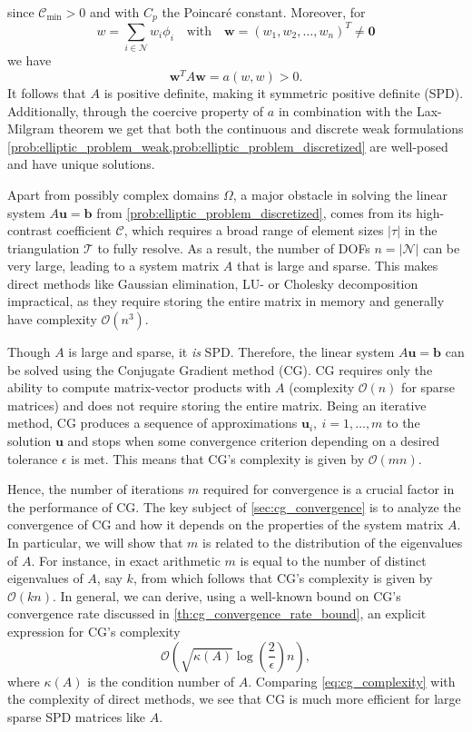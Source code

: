since $\mathcal{C}_{\text{min}}>0$ and with $C_p$ the Poincaré constant. Moreover, for 
\[
    w = \sum_{i\in\mathcal{N}} w_i \phi_i \quad \text{with} \quad \mathbf{w} = (w_1, w_2, \ldots, w_n)^T \neq \mathbf{0}
\]
we have
\begin{equation*}
    \mathbf{w}^T A \mathbf{w} = a(w,w) > 0.
\end{equation*}
It follows that $A$ is positive definite, making it symmetric positive definite (SPD). Additionally, through the coercive property of $a$ in combination with the Lax-Milgram theorem we get that both the continuous and discrete weak formulations \cref{prob:elliptic_problem_weak,prob:elliptic_problem_discretized} are well-posed and have unique solutions.

Apart from possibly complex domains $\Omega$, a major obstacle in solving the linear system $A\mathbf{u} = \mathbf{b}$ from \cref{prob:elliptic_problem_discretized}, comes from its high-contrast coefficient $\mathcal{C}$, which requires a broad range of element sizes $|\tau|$ in the triangulation $\mathcal{T}$ to fully resolve. As a result, the number of DOFs $n = |\mathcal{N}|$ can be very large, leading to a system matrix $A$ that is large and sparse. This makes direct methods like Gaussian elimination, LU- or Cholesky decomposition impractical, as they require storing the entire matrix in memory and generally have complexity $\mathcal{O}(n^3)$.

Though $A$ is large and sparse, it \textit{is} SPD. Therefore, the linear system $A\mathbf{u} = \mathbf{b}$ can be solved using the Conjugate Gradient method (CG). CG requires only the ability to compute matrix-vector products with $A$ (complexity $\mathcal{O}(n)$ for sparse matrices) and does not require storing the entire matrix. Being an iterative method, CG produces a sequence of approximations $\mathbf{u}_i, \ i = 1,\dots,m$ to the solution $\mathbf{u}$ and stops when some convergence criterion depending on a desired tolerance $\epsilon$ is met. This means that CG's complexity is given by $\mathcal{O}(mn)$.

Hence, the number of iterations $m$ required for convergence is a crucial factor in the performance of CG. The key subject of \cref{sec:cg_convergence} is to analyze the convergence of CG and how it depends on the properties of the system matrix $A$. In particular, we will show that $m$ is related to the distribution of the eigenvalues of $A$. For instance, in exact arithmetic $m$ is equal to the number of distinct eigenvalues of $A$, say $k$, from which follows that CG's complexity is given by $\mathcal{O}(kn)$. In general, we can derive, using a well-known bound on CG's convergence rate discussed in \cref{th:cg_convergence_rate_bound}, an explicit expression for CG's complexity
\begin{equation}
  \mathcal{O}\left(\sqrt{\kappa(A)}\log\left(\frac{2}{\epsilon}\right)n\right),
  \label{eq:cg_complexity}
\end{equation}
where $\kappa(A)$ is the condition number of $A$. Comparing \cref{eq:cg_complexity} with the complexity of direct methods, we see that CG is much more efficient for large sparse SPD matrices like $A$. 

